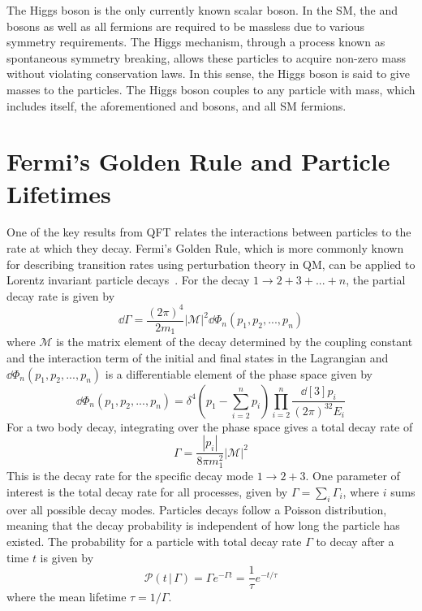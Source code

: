 The Higgs boson is the only currently known scalar boson. In the SM, the \PZ and \PWpm bosons as well as all fermions are required to be massless due to various symmetry requirements. The Higgs mechanism, through a process known as spontaneous symmetry breaking, allows these particles to acquire non-zero mass without violating conservation laws. In this sense, the Higgs boson is said to give masses to the particles. The Higgs boson couples to any particle with mass, which includes itself, the aforementioned \PZ and \PWpm bosons, and all SM fermions.

\section{Fermi's Golden Rule and Particle Lifetimes} \label{sec:theory_fermi}
One of the key results from QFT relates the interactions between particles to the rate at which they decay. Fermi's Golden Rule, which is more commonly known for describing transition rates using perturbation theory in QM, can be applied to Lorentz invariant particle decays~\cite{pdg2024}. For the decay $1\to2+3+...+n$, the partial decay rate is given by
\begin{equation}
	\dd{\Gamma}=\frac{(2\pi)^4}{2m_1}|\mathcal{M}|^2\dd{\Phi_n(p_1,p_2,...,p_n)}
\end{equation}
where $\mathcal{M}$ is the matrix element of the decay determined by the coupling constant and the interaction term of the initial and final states in the Lagrangian and $\dd{\Phi_n(p_1,p_2,...,p_n)}$ is a differentiable element of the phase space given by
\begin{equation}
	\dd{\Phi_n(p_1,p_2,...,p_n)}=\delta^4(p_1-\sum_{i=2}^n p_i)\prod_{i=2}^n\frac{\dd[3]{p_i}}{(2\pi)^32E_i}
\end{equation}
For a two body decay, integrating over the phase space gives a total decay rate of
\begin{equation}
	\Gamma=\frac{|p_i|}{8\pi m_1^2}|\mathcal{M}|^2
\end{equation}
This is the decay rate for the specific decay mode $1\to2+3$. One parameter of interest is the total decay rate for all processes, given by $\Gamma=\sum_{i}\Gamma_i$, where $i$ sums over all possible decay modes. Particles decays follow a Poisson distribution, meaning that the decay probability is independent of how long the particle has existed. The probability for a particle with total decay rate $\Gamma$ to decay after a time $t$ is given by
\begin{equation}
	\mathcal{P}(t\,|\,\Gamma)=\Gamma e^{-\Gamma t}=\frac{1}{\tau}e^{-t/\tau}
\end{equation}
where the mean lifetime $\tau=1/\Gamma$.

